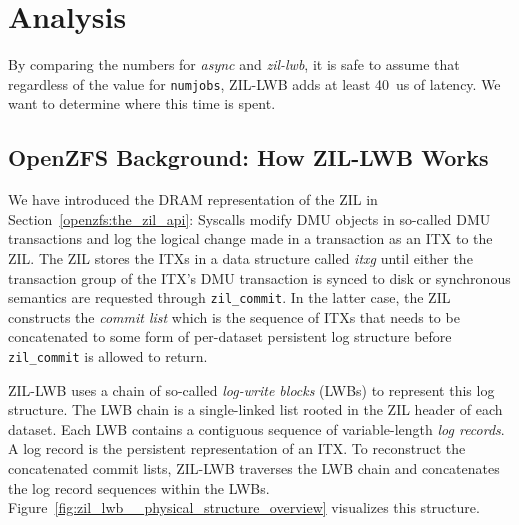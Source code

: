 \documentclass[12pt,a4paper,twoside]{book}
\begin{document}
\section{Analysis}\label{ch:lwb_analysis:breakdown}

By comparing the numbers for \textit{async} and \textit{zil-lwb}, it is safe to assume that regardless of the value for \lstinline{numjobs}, ZIL-LWB adds at least \SI{40}{us} of latency.
We want to determine where this time is spent.

\subsection{OpenZFS Background: How ZIL-LWB Works}\label{ch:lwb_analysis:openzfs_background_zil_lwb}
We have introduced the DRAM representation of the ZIL in Section~\ref{openzfs:the_zil_api}:
Syscalls modify DMU objects in so-called DMU transactions and log the logical change made in a transaction as an ITX to the ZIL.
The ZIL stores the ITXs in a data structure called \textit{itxg} until either the transaction group of the ITX's DMU transaction is synced to disk or synchronous semantics are requested through \lstinline{zil_commit}.
In the latter case, the ZIL constructs the \textit{commit list} which is the sequence of ITXs that needs to be concatenated to some form of per-dataset persistent log structure before \lstinline{zil_commit} is allowed to return.

ZIL-LWB uses a chain of so-called \textit{log-write blocks} (LWBs) to represent this log structure.
The LWB chain is a single-linked list rooted in the ZIL header of each dataset.
Each LWB contains a contiguous sequence of variable-length \textit{log records}.
A log record is the persistent representation of an ITX.
To reconstruct the concatenated commit lists, ZIL-LWB traverses the LWB chain and concatenates the log record sequences within the LWBs.
Figure~\ref{fig:zil_lwb__physical_structure_overview} visualizes this structure.
\end{document}
